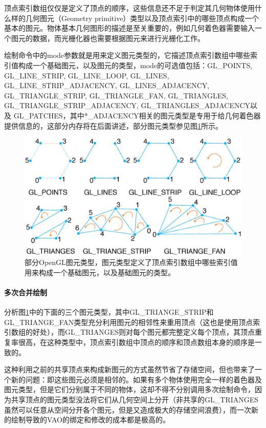 顶点索引数组仅仅是定义了顶点的顺序，这些信息还不足于判定其几何物体使用什么样的几何图元（Geometry primitive）类型以及顶点索引中的哪些顶点构成一个基本的图元。物体基本几何图形的描述是至关重要的，例如几何着色器需要输入一个图元的数据，而光栅化器也需要根据图元来进行光栅化工作。

绘制命令中的mode参数就是用来定义图元类型的，它描述顶点索引数组中哪些索引值构成一个基础图元，以及图元的类型，mode的可选值包括：GL\_POINTS, GL\_LINE\_STRIP, GL\_LINE\_LOOP, GL\_LINES, GL\_LINE\_STRIP\_ADJACENCY, GL\_LINES\_ADJACENCY, GL\_TRIANGLE\_STRIP, GL\_TRIANGLE\_FAN, GL\_TRIANGLES, GL\_TRIANGLE\_STRIP\_ADJACENCY, GL\_TRIANGLES\_ADJACENCY以及 GL\_PATCHES，其中*\_ADJACENCY相关的图元类型是专用于给几何着色器提供信息的，这部分内存将在后面讲述，部分图元类型参见图\ref{f:api-primitives}所示。

\begin{figure}
	\includegraphics[width=\textwidth]{figures/api/primitives}
	\caption{部分OpenGL图元类型，图元类型定义了顶点索引数组中哪些索引值用来构成一个基础图元，以及基础图元的类型。}
	\label{f:api-primitives}
\end{figure}





\paragraph{多次合并绘制}
分析图\ref{f:api-primitives}中的下面的三个图元类型，其中GL\_TRIANGE\_STRIP和GL\_TRIANGE\_FAN类型充分利用图元的相邻性来重用顶点（这也是使用顶点索引数组的好处），而GL\_TRIANGES则对每个图元都完整定义每个顶点，其顶点重复率很高，在这种类型中，顶点索引数组中顶点的顺序和顶点数组本身的顺序是一致的。

这种利用之前的共享顶点来构成新图元的方式虽然节省了存储空间，但也带来了一个新的问题：即这些图元必须是相邻的。如果有多个物体使用完全一样的着色器及图元类型，但是它们分别属于不同的物体，这却不得不分别调用多次绘制命令，因为共享顶点的图元类型没法将它们从几何空间上分开（非共享的GL\_TRIANGES虽然可以任意从空间分开各个图元，但是又造成极大的存储空间浪费），而一次新的绘制导致的VAO的绑定和修改的成本都是极高的。

